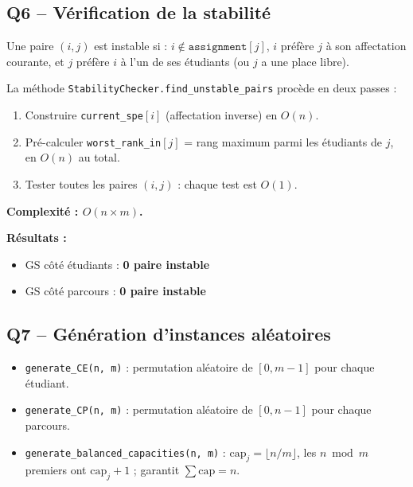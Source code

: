 \documentclass[11pt,a4paper]{article}
\begin{document}
\subsection*{Q6 -- Vérification de la stabilité}

Une paire $(i, j)$ est instable si : $i \notin \texttt{assignment}[j]$, $i$ préfère $j$ à son affectation courante, et $j$ préfère $i$ à l'un de ses étudiants (ou $j$ a une place libre).

La méthode \texttt{StabilityChecker.find\_unstable\_pairs} procède en deux passes :
\begin{enumerate}
  \item Construire \texttt{current\_spe}$[i]$ (affectation inverse) en $O(n)$.
  \item Pré-calculer \texttt{worst\_rank\_in}$[j]$ = rang maximum parmi les étudiants de $j$, en $O(n)$ au total.
  \item Tester toutes les paires $(i, j)$ : chaque test est $O(1)$.
\end{enumerate}

\textbf{Complexité : $O(n \times m)$.}

\textbf{Résultats :}
\begin{itemize}
  \item GS côté étudiants : \textbf{0 paire instable} \checkmark
  \item GS côté parcours : \textbf{0 paire instable} \checkmark
\end{itemize}

\subsection*{Q7 -- Génération d'instances aléatoires}

\begin{itemize}
  \item \texttt{generate\_CE(n, m)} : permutation aléatoire de $[0, m-1]$ pour chaque étudiant.
  \item \texttt{generate\_CP(n, m)} : permutation aléatoire de $[0, n-1]$ pour chaque parcours.
  \item \texttt{generate\_balanced\_capacities(n, m)} : $\mathrm{cap}_j = \lfloor n/m \rfloor$, les $n \bmod m$ premiers ont $\mathrm{cap}_j + 1$ ; garantit $\sum \mathrm{cap} = n$.
\end{itemize}

\end{document}
